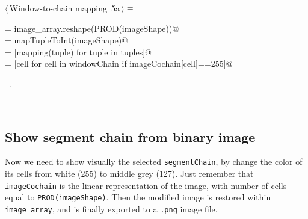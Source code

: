 \documentclass[11pt,oneside]{article}	%
\begin{document}
\begin{flushleft} \small
\begin{minipage}{\linewidth} \label{scrap7}
\protect{}$\langle\,$Window-to-chain mapping\nobreak\ {\footnotesize 5a}$\,\rangle\equiv$
\vspace{-1ex}
\begin{list}{}{} \item
\mbox{}\verb@imageCochain = image_array.reshape(PROD(imageShape))@\\
\mbox{}\verb@mapping = mapTupleToInt(imageShape)@\\
\mbox{}\verb@windowChain = [mapping(tuple) for tuple in tuples]@\\
\mbox{}\verb@segmentChain = [cell for cell in windowChain if imageCochain[cell]==255]@\\
\mbox{}\verb@@{\NWsep}
\end{list}
\vspace{-1ex}
\footnotesize\addtolength{\baselineskip}{-1ex}
\begin{list}{}{\setlength{\itemsep}{-\parsep}\setlength{\itemindent}{-\leftmargin}}
\item \NWtxtMacroRefIn\ .
\end{list}
\end{minipage}\\[4ex]
\end{flushleft}

\subsection{Show segment chain from binary image}

Now we need to show visually the selected \texttt{segmentChain}, by change the color of its cells from white (255) to middle grey (127). Just remember that \texttt{imageCochain} is the linear representation of the image, with number of cells equal to \texttt{PROD(imageShape)}. Then the modified image is restored within \texttt{image\_array}, and is finally exported to a \texttt{.png} image file.
\end{document}
